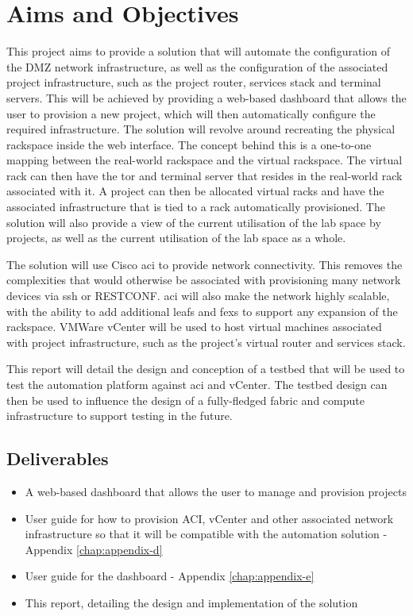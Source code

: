 \section{Aims and Objectives}
\label{intro:aims}

This project aims to provide
a solution that will automate the
configuration of the DMZ network
infrastructure, as well as the configuration of the associated project
infrastructure, such as the project router, services stack and terminal
servers. This will be achieved by providing a web-based dashboard that allows
the user to provision a new project, which will then automatically configure
the required infrastructure. The solution will revolve around recreating the
physical rackspace inside the web interface. The concept behind this is a
one-to-one mapping between the real-world rackspace and the virtual rackspace.
The virtual rack can then have the \gls{tor} and terminal server that resides
in the real-world rack associated with it. A project can then be allocated
virtual racks and have the associated infrastructure that is tied to a rack
automatically provisioned. The solution will also provide a view of the current
utilisation of the lab space by projects, as well as the current utilisation of
the lab space as a whole.

The solution will use Cisco \gls{aci} to provide
network connectivity. This removes the complexities that would otherwise be
associated with provisioning many network devices via \gls{ssh} or RESTCONF.
\gls{aci} will also make the network highly scalable, with the ability to add
additional leafs and \gls{fex}s to support any expansion of the rackspace.
VMWare vCenter will be used to host virtual machines associated with project
infrastructure, such as the project's virtual router and services stack.

This
report will detail the design and conception of a testbed that will be used to
test the automation platform against \gls{aci} and vCenter. The testbed design
can then be used to influence the design of a fully-fledged fabric and compute infrastructure to support testing in the future.
\subsection{Deliverables}
\label{intro:aims:deliverables}

\begin{itemize}
      \item A web-based dashboard that allows the user to manage
            and provision projects
            
      \item User guide for how to provision ACI, vCenter and other associated
            network infrastructure so that it will be compatible with the automation
            solution - Appendix \ref{chap:appendix-d}
            
      \item User guide for the dashboard - Appendix \ref{chap:appendix-e}
            
      \item This report, detailing the design and implementation of the
            solution
\end{itemize}

